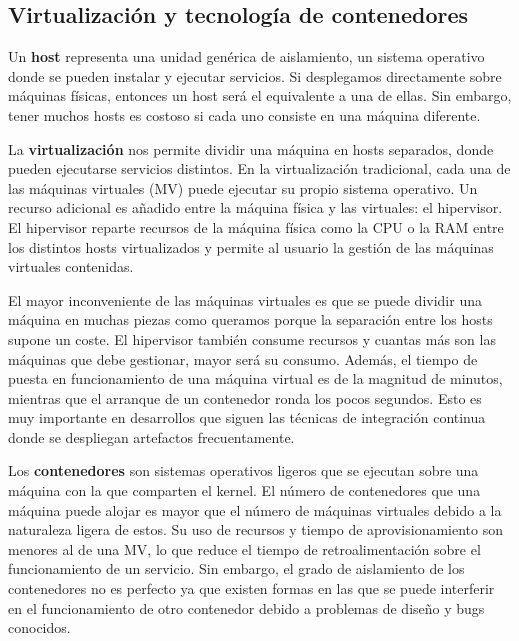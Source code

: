 \documentclass[11pt,spanish,listoffigures]{tfgetsinf}
\begin{document}
\subsection{Virtualización y tecnología de contenedores}

Un \textbf{host} representa una unidad genérica de aislamiento, un sistema operativo donde se pueden instalar y ejecutar servicios. Si desplegamos directamente sobre máquinas físicas, entonces un host será el equivalente a una de ellas. Sin embargo, tener muchos hosts es costoso si cada uno consiste en una máquina diferente. \cite{Newman2015a}

La \textbf{virtualización} nos permite dividir una máquina en hosts separados, donde pueden ejecutarse servicios distintos. En la virtualización tradicional, cada una de las máquinas virtuales (MV) puede ejecutar su propio sistema operativo. Un recurso adicional es añadido entre la máquina física y las virtuales: el hipervisor. El hipervisor reparte recursos de la máquina física como la CPU o la RAM entre los distintos hosts virtualizados y permite al usuario la gestión de las máquinas virtuales contenidas.

El mayor inconveniente de las máquinas virtuales es que se puede dividir una máquina en muchas piezas como queramos porque la separación entre los hosts supone un coste. El hipervisor también consume recursos y cuantas más son las máquinas que debe gestionar, mayor será su consumo. Además, el tiempo de puesta en funcionamiento de una máquina virtual es de la magnitud de minutos, mientras que el arranque de un contenedor ronda los pocos segundos. \cite{Dua2014} Esto es muy importante en desarrollos que siguen las técnicas de integración continua donde se despliegan artefactos frecuentamente. 

Los \textbf{contenedores} son sistemas operativos ligeros que se ejecutan sobre una máquina con la que comparten el kernel. El número de contenedores que una máquina puede alojar es mayor que el número de máquinas virtuales debido a la naturaleza ligera de estos. \cite{Dua2014} Su uso de recursos y tiempo de aprovisionamiento son menores al de una MV, lo que reduce el tiempo de retroalimentación sobre el funcionamiento de un servicio. Sin embargo, el grado de aislamiento de los contenedores no es perfecto ya que existen formas en las que se puede interferir en el funcionamiento de otro contenedor debido a problemas de diseño y bugs conocidos. \cite{Newman2015a}
\end{document}
